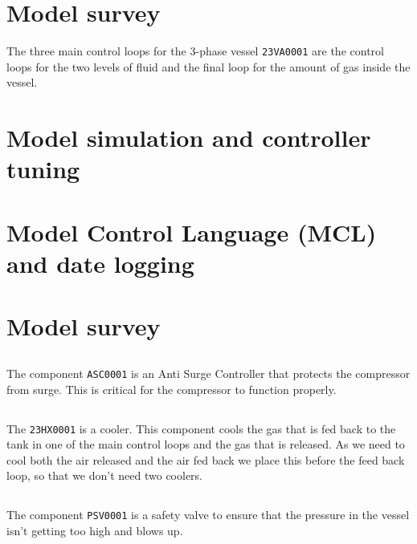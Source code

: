 \documentclass[a4paper]{scrartcl}
\begin{document}
\section{Model survey}
The three main control loops for the 3-phase vessel \texttt{23VA0001} are the control loops for the two levels of fluid and the final loop for the amount of gas inside the vessel.\\

\section{Model simulation and controller tuning}
\subsection{}


\section{Model Control Language (MCL) and date logging}

\section{Model survey}
\subsection{}
The component \texttt{ASC0001} is an Anti Surge Controller that protects the compressor from surge. This is critical for the compressor to function properly.
\subsection{}
The \texttt{23HX0001} is a cooler. This component cools the gas that is fed back to the tank in one of the main control loops and the gas that is released. As we need to cool both the air released and the air fed back we place this before the feed back loop, so that we don't need two coolers.
\subsection{}
The component \texttt{PSV0001} is a safety valve to ensure that the pressure in the vessel isn't getting too high and blows up.
\end{document}
